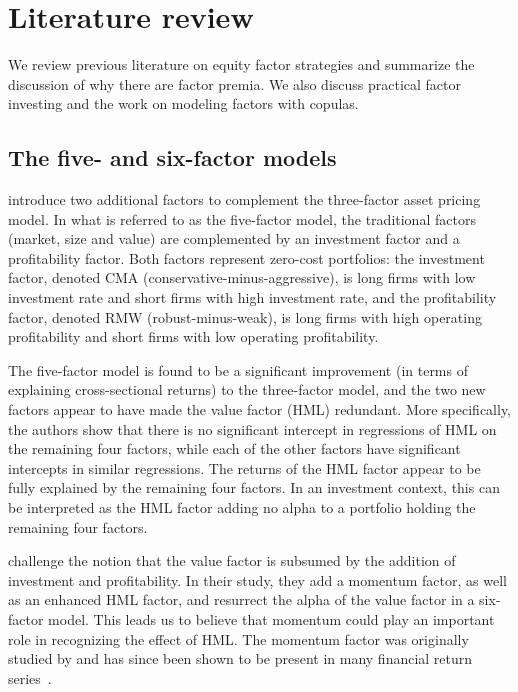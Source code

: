 \section{Literature review}
\label{sec:literature}

We review previous literature on equity factor strategies and summarize the discussion of why there are factor premia. We also discuss practical factor investing and the work on modeling factors with copulas.

\subsection{The five- and six-factor models}

\textcite{FF2015} introduce two additional factors to complement the \textcite{FamaFrench1993} three-factor asset pricing model. In what is referred to as the five-factor model, the traditional factors (market, size and value) are complemented by an investment factor and a profitability factor. Both factors represent zero-cost portfolios: the investment factor, denoted CMA (conservative-minus-aggressive), is long firms with low investment rate and short firms with high investment rate, and the profitability factor, denoted RMW (robust-minus-weak), is long firms with high operating profitability and short firms with low operating profitability.

The five-factor model is found to be a significant improvement (in terms of explaining cross-sectional returns) to the three-factor model, and the two new factors appear to have made the value factor (HML) redundant. More specifically, the authors show that there is no significant intercept in regressions of HML on the remaining four factors, while each of the other factors have significant intercepts in similar regressions. The returns of the HML factor appear to be fully explained by the remaining four factors. In an investment context, this can be interpreted as the HML factor adding no alpha to a portfolio holding the remaining four factors.

\textcite{Asness2015} challenge the notion that the value factor is subsumed by the addition of investment and profitability. In their study, they add a momentum factor, as well as an enhanced HML factor, and resurrect the alpha of the value factor in a six-factor model. This leads us to believe that momentum could play an important role in recognizing the effect of HML. The momentum factor was originally studied by \textcite{JegadeeshTitman1993} and has since been shown to be present in many financial return series~\autocite{AsnessMoskovitzPedersen2013}.

